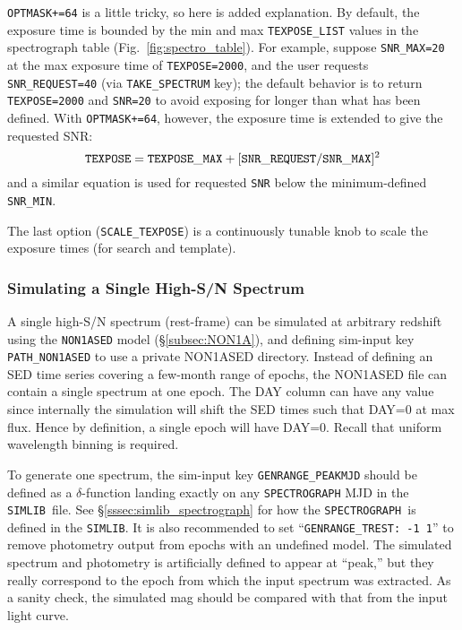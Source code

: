 \documentclass[12pt]{article}
\newcommand{\SPEC}{{\tt SPECTROGRAPH}}
\newcommand{\simlib}{{\tt SIMLIB}}
\begin{document}
{\tt OPTMASK+=64} is a little tricky, so here is added explanation.
By default, the exposure time is bounded by the min and max 
{\tt TEXPOSE\_LIST} values in the spectrograph table
(Fig.~\ref{fig:spectro_table}). For example, suppose {\tt SNR\_MAX=20}
at the max exposure time of {\tt TEXPOSE=2000}, and the user
requests {\tt SNR\_REQUEST=40} (via {\tt TAKE\_SPECTRUM} key);
the default behavior is to return {\tt TEXPOSE=2000} 
and {\tt SNR=20} to avoid exposing for longer than what has
been defined. With {\tt OPTMASK+=64}, however, the exposure
time is extended to give the requested SNR:
\begin{equation}
{\tt TEXPOSE} = {\tt TEXPOSE\_MAX} + [{\tt SNR\_REQUEST}/{\tt SNR\_MAX}]^2
\end{equation}
and a similar equation is used for requested {\tt SNR} below
the minimum-defined {\tt SNR\_MIN}.


The last option ({\tt SCALE\_TEXPOSE})
is a continuously tunable knob to scale
the exposure times (for search and template).

\subsubsection{Simulating a Single High-S/N Spectrum}
\label{sss:ONESPEC}

A single high-S/N spectrum (rest-frame) can be simulated 
at arbitrary redshift using the {\tt NON1ASED} model 
(\S\ref{subsec:NON1A}), and defining sim-input key 
{\tt PATH\_NON1ASED} to use a private NON1ASED directory.
Instead of defining an SED time
series covering a few-month range of epochs, the NON1ASED
file can contain a single spectrum at one epoch. 
The DAY column can have any value since internally the
simulation will shift the SED times such that DAY=0 
at max flux. Hence by definition, a single epoch will
have DAY=0. Recall that uniform wavelength binning is required.

To generate one spectrum, the sim-input key {\tt GENRANGE\_PEAKMJD}
should be defined as a $\delta$-function landing exactly on any
{\SPEC} MJD in the \simlib\ file.
See \S\ref{sssec:simlib_spectrograph} for how the
\SPEC\ is defined in the \simlib.
It is also recommended to set ``{\tt GENRANGE\_TREST: -1 1}''
to remove photometry output from epochs with an undefined model.
The simulated spectrum and photometry is artificially defined
to appear at ``peak,'' but they really correspond to the epoch
from which the input spectrum was extracted. 
As a sanity check, the simulated mag should be compared with 
that from the input light curve.
\end{document}
